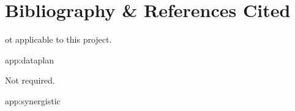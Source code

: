 \documentclass[11pt]{article}
\begin{document}
\newpage
\lhead{ }
\appendix
\renewcommand{\thesection}{A.\arabic{section}}


\newpage 
\pagestyle{fancy} 
\section{Bibliography \& References Cited}

\medskip
\begingroup
\renewcommand{\section}[2]{} %


\endgroup

\lhead{}

\newpage
\section{Facilities \& Other Resources} %
\noindent



\newpage
\section{Equipment}

Not applicable to this project.

\newpage
\section{Data Management Plan} %
\label{app:dataplan}

Not required. %

%

\newpage
\section{Synergistic Activities} %
\label{app:synergistic}


\end{document}
